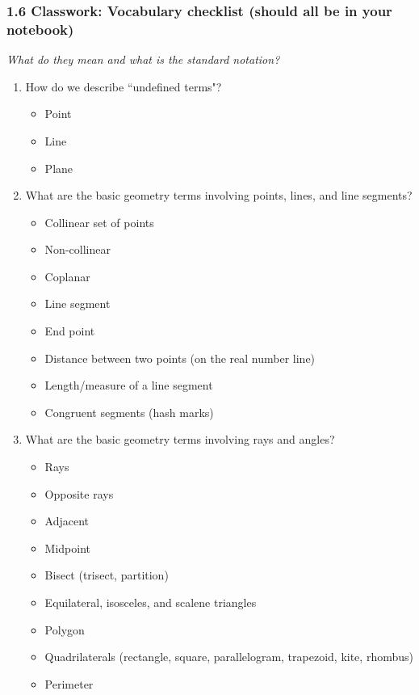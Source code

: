 

\fancyhead[LE]{\thepage}



\subsubsection*{1.6 Classwork: Vocabulary checklist (should all be in your notebook)}
\emph{What do they mean and what is the standard notation?}
\begin{enumerate}
\item How do we describe ``undefined terms"?
\begin{itemize}
    \item Point
    \item Line
    \item Plane
\end{itemize}

\item What are the basic geometry terms involving points, lines, and line segments?
\begin{itemize}
    \item Collinear set of points
    \item Non-collinear
    \item Coplanar
    \item Line segment
    \item End point
    \item Distance between two points (on the real number line)
    \item Length/measure of a line segment
    \item Congruent segments (hash marks)
\end{itemize}

\item What are the basic geometry terms involving rays and angles?
\begin{itemize}
    \item Rays
    \item Opposite rays
    \item Adjacent
    \item Midpoint
    \item Bisect (trisect, partition)
    \item Equilateral, isosceles, and scalene triangles
    \item Polygon
    \item Quadrilaterals (rectangle, square, parallelogram, trapezoid, kite, rhombus)
    \item Perimeter
\end{itemize}


\end{enumerate}

